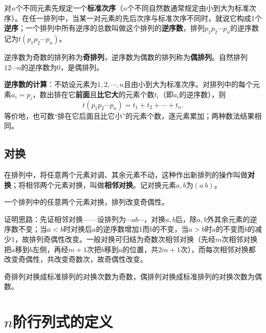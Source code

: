 对$n$个不同元素先规定一个\textbf{标准次序}（$n$个不同自然数通常规定由小到大为标准次序）。在任一排列中，当某一对元素的先后次序与标准次序不同时，就说它构成1个\textbf{逆序}；一个排列中所有逆序的总数叫做这个排列的\textbf{逆序数}，排列$p_1p_2\cdots p_n$的逆序数记为$t(p_1p_2\cdots p_n)$。

\begin{definition}
逆序数为奇数的排列称为\textbf{奇排列}，逆序数为偶数的排列称为\textbf{偶排列}。自然排列$12\cdots n$的逆序数为$0$，是偶排列。
\end{definition}

\textbf{逆序数的计算}：不妨设元素为$1,2,\cdots,n$且由小到大为标准次序。对排列中的每个元素$a_i=p_i$，数出排在它\textbf{前面}且\textbf{比它大}的元素个数$t_i$（即$a_i$的逆序数），则
\[
t(p_1p_2\cdots p_n)=t_1+t_2+\cdots+t_n.
\]
等价地，也可数“排在它后面且比它小”的元素个数，逐元素累加；两种数法结果相同。

\subsection{对换}

在排列中，将任意两个元素对调、其余元素不动，这种作出新排列的操作叫做\textbf{对换}；将相邻两个元素对换，叫做\textbf{相邻对换}。记对换元素$a,b$为$(a\ b)$。

\begin{theorem}
一个排列中的任意两个元素对换，排列改变奇偶性。
\end{theorem}

证明思路：先证相邻对换——设排列为$\cdots ab\cdots$，对换$a,b$后，除$a,b$外其余元素的逆序数不变；当$a<b$时对换后$a$的逆序数增加1而$b$的不变，当$a>b$时$a$的不变而$b$的减少1，故排列奇偶性改变。一般对换可归结为奇数次相邻对换（先经$m$次相邻对换把$a$移到$b$左侧，再经$m+1$次把$b$移到$a$的位置，共$2m+1$次），而每次相邻对换都改变奇偶性，共改变奇数次，故奇偶性改变。

\begin{corollary}
奇排列对换成标准排列的对换次数为奇数，偶排列对换成标准排列的对换次数为偶数。
\end{corollary}


\section{$n$阶行列式的定义}

